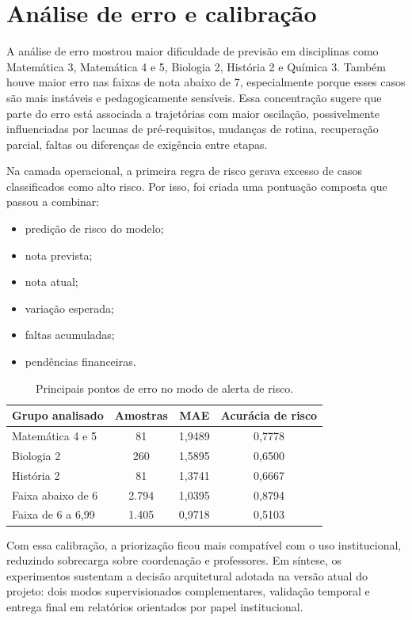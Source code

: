 \section{An\'alise de erro e calibra\c{c}\~ao}
\label{sec:erro}
\label{sec:importancia-atributos-temporais}
\label{sec:discussao-uso-pedagogico}
\label{sec:limitacoes-experimentos}
\label{sec:consideracoes-finais-resultados}

A an\'alise de erro mostrou maior dificuldade de previs\~ao em disciplinas como Matem\'atica 3, Matem\'atica 4 e 5, Biologia 2, Hist\'oria 2 e Qu\'imica 3. Tamb\'em houve maior erro nas faixas de nota abaixo de 7, especialmente porque esses casos s\~ao mais inst\'aveis e pedagogicamente sens\'iveis. Essa concentra\c{c}\~ao sugere que parte do erro est\'a associada a trajet\'orias com maior oscila\c{c}\~ao, possivelmente influenciadas por lacunas de pr\'e-requisitos, mudan\c{c}as de rotina, recupera\c{c}\~ao parcial, faltas ou diferen\c{c}as de exig\^encia entre etapas.

Na camada operacional, a primeira regra de risco gerava excesso de casos classificados como alto risco. Por isso, foi criada uma pontua\c{c}\~ao composta que passou a combinar:
\begin{itemize}
    \item predi\c{c}\~ao de risco do modelo;
    \item nota prevista;
    \item nota atual;
    \item varia\c{c}\~ao esperada;
    \item faltas acumuladas;
    \item pend\^encias financeiras.
\end{itemize}

\begin{table}[ht]
\caption{Principais pontos de erro no modo de alerta de risco.}
\label{tab:erro-alerta}
\centering
\footnotesize
\begin{tabular}{l c c c}
\hline
\textbf{Grupo analisado} & \textbf{Amostras} & \textbf{MAE} & \textbf{Acur\'acia de risco} \\
\hline
Matem\'atica 4 e 5 & 81 & 1,9489 & 0,7778 \\
Biologia 2 & 260 & 1,5895 & 0,6500 \\
Hist\'oria 2 & 81 & 1,3741 & 0,6667 \\
Faixa abaixo de 6 & 2.794 & 1,0395 & 0,8794 \\
Faixa de 6 a 6,99 & 1.405 & 0,9718 & 0,5103 \\
\hline
\end{tabular}
\par\smallskip{}\par
\end{table}

Com essa calibra\c{c}\~ao, a prioriza\c{c}\~ao ficou mais compat\'ivel com o uso institucional, reduzindo sobrecarga sobre coordena\c{c}\~ao e professores. Em s\'intese, os experimentos sustentam a decis\~ao arquitetural adotada na vers\~ao atual do projeto: dois modos supervisionados complementares, valida\c{c}\~ao temporal e entrega final em relat\'orios orientados por papel institucional.
